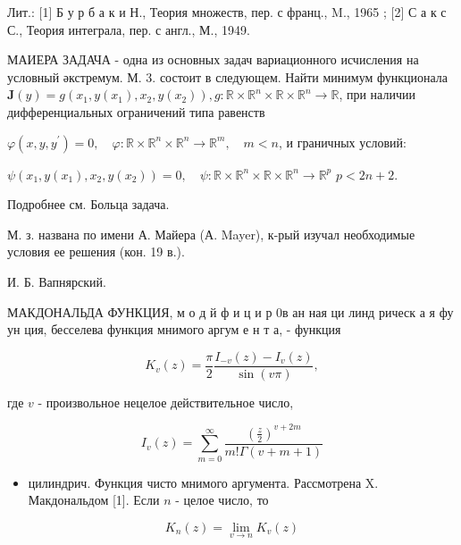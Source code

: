 \documentclass[10pt]{article}
\begin{document}
Лит.: [1] Б у р б а к и Н., Теория множеств, пер. с франц., M., 1965 ; [2] С а к с С., Теория интеграла, пер. с англ., М., 1949.



МАИЕРА ЗАДАЧА - одна из основных задач вариационного исчисления на условный әкстремум. М. 3. состоит в следующем. Найти минимум функционала $\boldsymbol{J}(y)=g\left(x_{1}, y\left(x_{1}\right), x_{2}, y\left(x_{2}\right)\right), g: \mathbb{R} \times \mathbb{R}^{n} \times \mathbb{R} \times \mathbb{R}^{n} \longrightarrow \mathbb{R}$, при наличии дифференциальных ограничений типа равенств



$\varphi\left(x, y, y^{\prime}\right)=0, \quad \varphi: \mathbb{R} \times \mathbb{R}^{n} \times \mathbb{R}^{n} \longrightarrow \mathbb{R}^{m}, \quad m<n$, и граничных условий:



$\psi\left(x_{1}, y\left(x_{1}\right), x_{2}, y\left(x_{2}\right)\right)=0, \quad \psi: \mathbb{R} \times \mathbb{R}^{n} \times \mathbb{R} \times \mathbb{R}^{n} \longrightarrow \mathbb{R}^{p}$ $p<2 n+2$.



Подробнее см. Больца задача.



М. з. названа по имени А. Майера (А. Mayer), к-рый изучал необходимые условия ее решения (кон. 19 в.).



И. Б. Вапнярский.



МАКДОНАЛЬДА ФУНКЦИЯ, м о д й ф и ц и р 0в ан ная ци линд рическ а я фу ун ция, бесселева функция мнимого аргум е н т а, - функция



\[

K_{v}(z)=\frac{\pi}{2} \frac{I_{-v}(z)-I_{v}(z)}{\sin (v \pi)},

\]



где $v$ - произвольное нецелое действительное число,



\[

I_{v}(z)=\sum_{m=0}^{\infty} \frac{\left(\frac{z}{2}\right)^{v+2 m}}{m ! \Gamma(v+m+1)}

\]



\begin{itemize}

  \item цилиндрич. Функция чисто мнимого аргумента. Рассмотрена X. Макдональдом [1]. Если $n$ - целое число, то

\end{itemize}



\[

K_{n}(z)=\lim _{v \rightarrow n} K_{v}(z)

\]
\end{document}
